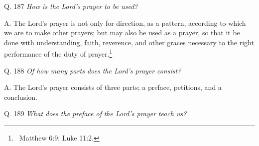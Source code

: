 {{{\bigskip

Q. 187 \textit{How is the Lord's prayer}\textit{ to be used?}

A. The Lord's prayer is not only for
direction, as a pattern, according to which we are to make other prayers; but may
also be used as a prayer, so that it be done with understanding,
faith, reverence, and other graces necessary to the right performance of the
duty of prayer.\footnote{\ Matthew 6:9; Luke
11:2.}


\bigskip

Q. 188 \textit{Of how many parts does the Lord's prayer}\textit{
consist?}

A. The Lord's prayer consists of three parts; a
preface, petitions, and a
conclusion.


\bigskip

Q. 189 \textit{What does the preface of}\textit{ the Lord's
prayer}\textit{ teach us?}

}}}
